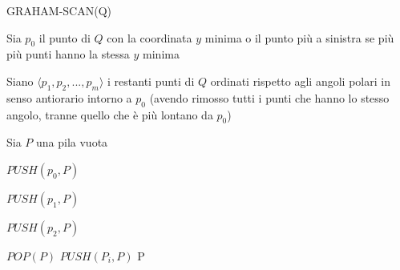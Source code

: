 \documentclass[12pt,a4paper]{report}
\begin{document}
\begin{algorithm}[ht]
\caption{GRAHAM-SCAN(Q)}\label{alg:graham}

\vspace{0.3cm}

\nl Sia $p_0$ il punto di $Q$ con la coordinata $y$ minima o il punto più a sinistra se più più punti hanno la stessa $y$ minima

\vspace{0.3cm}

\nl Siano $\langle p_1, p_2, ..., p_m \rangle$ i restanti punti di $Q$ ordinati rispetto agli angoli polari in senso antiorario intorno a $p_0$ (avendo rimosso tutti i punti che hanno lo stesso angolo, tranne quello che è più lontano da $p_0$)

\vspace{0.3cm}

\nl Sia $P$ una pila vuota

\vspace{0.3cm}

\nl $PUSH(p_0, P)$

\vspace{0.1cm}

\nl $PUSH(p_1, P)$

\vspace{0.1cm}

\nl $PUSH(p_2, P)$

\vspace{0.3cm}

\nl {} {
\vspace{0.1cm}
\nl {} {
\vspace{0.1cm}
\nl $POP(P)$
}
\vspace{0.1cm}
\nl $PUSH(P_i,P)$
}
\vspace{0.3cm}
\nl \Return P
\end{algorithm}
\end{document}
